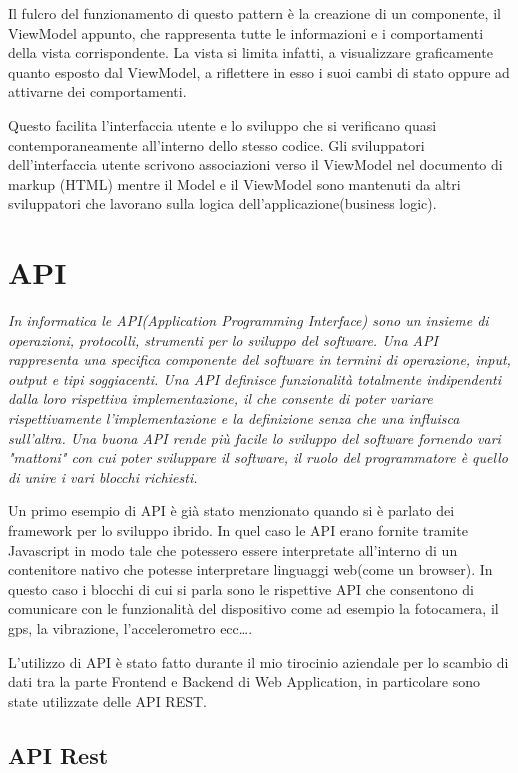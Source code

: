 Il fulcro del funzionamento di questo pattern è la creazione di un componente, il ViewModel appunto, che rappresenta tutte le informazioni e i comportamenti della vista corrispondente. La vista si limita infatti, a visualizzare graficamente quanto esposto dal ViewModel, a riflettere in esso i suoi cambi di stato oppure ad attivarne dei comportamenti.

Questo facilita l'interfaccia utente e lo sviluppo che si verificano quasi contemporaneamente all'interno dello stesso codice. Gli sviluppatori dell'interfaccia utente scrivono associazioni verso il ViewModel nel documento di markup (HTML) mentre il Model e il ViewModel sono mantenuti da altri sviluppatori che lavorano sulla logica dell'applicazione(business logic).

\section{API}

\emph{In informatica le API(Application Programming Interface) sono un insieme di operazioni, protocolli, strumenti per lo sviluppo del software. Una API rappresenta una specifica componente del software in termini di operazione, input, output e tipi soggiacenti. Una API definisce funzionalità totalmente indipendenti dalla loro rispettiva implementazione, il che consente di poter variare rispettivamente l'implementazione e la definizione senza che una influisca sull'altra. Una buona API rende più facile lo sviluppo del software fornendo vari "mattoni" con cui poter sviluppare il software, il ruolo del programmatore è quello di unire i vari blocchi richiesti.}
\hspace*{\fill}\cite{wiki:api}

Un primo esempio di API è già stato menzionato quando si è parlato dei framework per lo sviluppo ibrido. In quel caso le API erano fornite tramite Javascript in modo tale che potessero essere interpretate all'interno di un contenitore nativo che potesse interpretare linguaggi web(come un browser). In questo caso i blocchi di cui si parla sono le rispettive API che consentono di comunicare con le funzionalità del dispositivo come ad esempio la fotocamera, il gps, la vibrazione, l'accelerometro ecc\ldots.

L'utilizzo di API è stato fatto durante il mio tirocinio aziendale per lo scambio di dati tra la parte Frontend e Backend di Web Application, in particolare sono state utilizzate delle API REST.

\subsection{API Rest}

